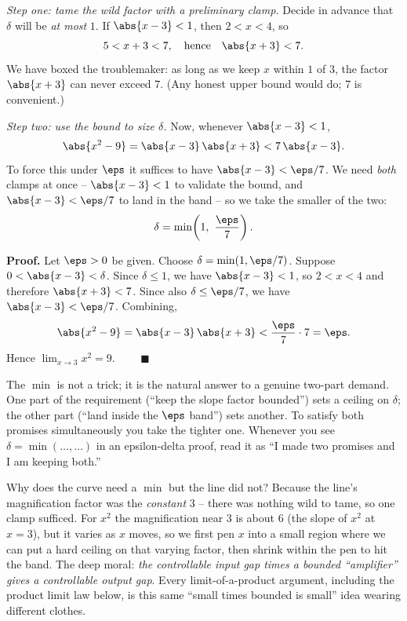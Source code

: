 \emph{Step one: tame the wild factor with a preliminary clamp.} Decide in advance
that $\delta$ will be \emph{at most} $1$. If $\abs{x-3}<1$, then $2<x<4$, so
\[
  5 < x+3 < 7, \quad\text{hence}\quad \abs{x+3} < 7.
\]
We have boxed the troublemaker: as long as we keep $x$ within $1$ of $3$, the
factor $\abs{x+3}$ can never exceed $7$. (Any honest upper bound would do; $7$ is
convenient.)

\emph{Step two: use the bound to size $\delta$.} Now, whenever $\abs{x-3}<1$,
\[
  \abs{x^2-9} = \abs{x-3}\,\abs{x+3} < 7\,\abs{x-3}.
\]
To force this under $\eps$ it suffices to have $\abs{x-3} < \eps/7$. We need
\emph{both} clamps at once -- $\abs{x-3}<1$ to validate the bound, and
$\abs{x-3}<\eps/7$ to land in the band -- so we take the smaller of the two:
\[
  \delta = \min\!\left(1,\ \frac{\eps}{7}\right).
\]

\textbf{Proof.} Let $\eps>0$ be given. Choose $\delta = \min(1,\eps/7)$. Suppose
$0<\abs{x-3}<\delta$. Since $\delta\le 1$, we have $\abs{x-3}<1$, so $2<x<4$ and
therefore $\abs{x+3}<7$. Since also $\delta\le\eps/7$, we have $\abs{x-3}<\eps/7$.
Combining,
\[
  \abs{x^2 - 9} = \abs{x-3}\,\abs{x+3} < \frac{\eps}{7}\cdot 7 = \eps.
\]
Hence $\lim_{x\to 3} x^2 = 9$. $\qquad\blacksquare$

\begin{intuitionbox}
The $\min$ is not a trick; it is the natural answer to a genuine two-part demand.
One part of the requirement (``keep the slope factor bounded'') sets a ceiling on
$\delta$; the other part (``land inside the $\eps$ band'') sets another. To
satisfy both promises simultaneously you take the tighter one. Whenever you see
$\delta = \min(\dots,\dots)$ in an epsilon-delta proof, read it as ``I made two
promises and I am keeping both.''
\end{intuitionbox}

\begin{whybox}
Why does the curve need a $\min$ but the line did not? Because the line's
magnification factor was the \emph{constant} $3$ -- there was nothing wild to
tame, so one clamp sufficed. For $x^2$ the magnification near $3$ is about $6$
(the slope of $x^2$ at $x=3$), but it varies as $x$ moves, so we first pen $x$
into a small region where we can put a hard ceiling on that varying factor, then
shrink within the pen to hit the band. The deep moral: \emph{the controllable
input gap times a bounded ``amplifier'' gives a controllable output gap}. Every
limit-of-a-product argument, including the product limit law below, is this same
``small times bounded is small'' idea wearing different clothes.
\end{whybox}

